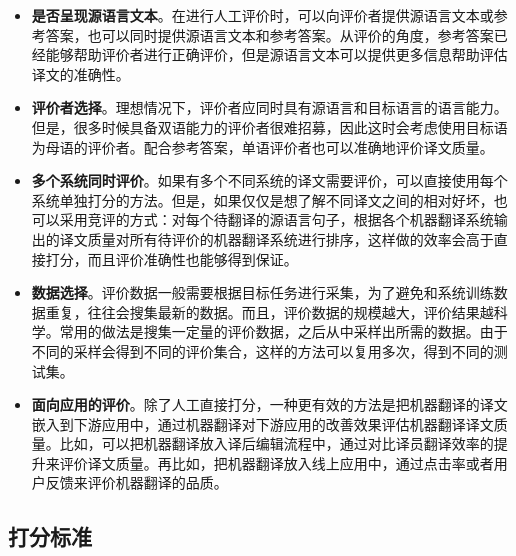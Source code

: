 \begin{itemize}
\vspace{0.5em}
\item {\small\sffamily\bfseries{是否呈现源语言文本}}。在进行人工评价时，可以向评价者提供源语言文本或参考答案，也可以同时提供源语言文本和参考答案。从评价的角度，参考答案已经能够帮助评价者进行正确评价，但是源语言文本可以提供更多信息帮助评估译文的准确性。
\vspace{0.5em}
\item {\small\sffamily\bfseries{评价者选择}}。理想情况下，评价者应同时具有源语言和目标语言的语言能力。但是，很多时候具备双语能力的评价者很难招募，因此这时会考虑使用目标语为母语的评价者。配合参考答案，单语评价者也可以准确地评价译文质量。
\vspace{0.5em}
\item {\small\sffamily\bfseries{多个系统同时评价}}。如果有多个不同系统的译文需要评价，可以直接使用每个系统单独打分的方法。但是，如果仅仅是想了解不同译文之间的相对好坏，也可以采用竞评的方式：对每个待翻译的源语言句子，根据各个机器翻译系统输出的译文质量对所有待评价的机器翻译系统进行排序，这样做的效率会高于直接打分，而且评价准确性也能够得到保证。
\vspace{0.5em}
\item {\small\sffamily\bfseries{数据选择}}。评价数据一般需要根据目标任务进行采集，为了避免和系统训练数据重复，往往会搜集最新的数据。而且，评价数据的规模越大，评价结果越科学。常用的做法是搜集一定量的评价数据，之后从中采样出所需的数据。由于不同的采样会得到不同的评价集合，这样的方法可以复用多次，得到不同的测试集。
\vspace{0.5em}
\item {\small\sffamily\bfseries{面向应用的评价}}。除了人工直接打分，一种更有效的方法是把机器翻译的译文嵌入到下游应用中，通过机器翻译对下游应用的改善效果评估机器翻译译文质量。比如，可以把机器翻译放入译后编辑流程中，通过对比译员翻译效率的提升来评价译文质量。再比如，把机器翻译放入线上应用中，通过点击率或者用户反馈来评价机器翻译的品质。
\vspace{0.5em}
\end{itemize}


\subsection{打分标准} \label{sec:human-eval-scoring}

